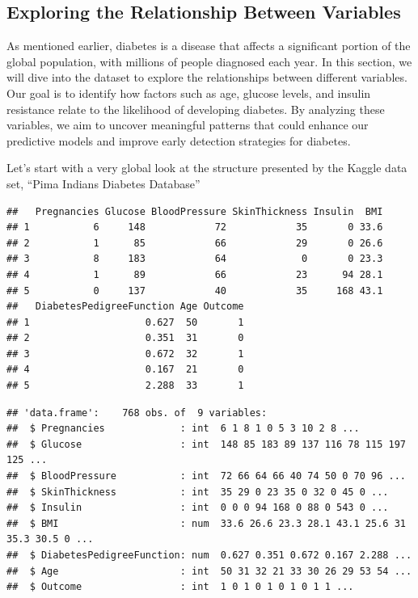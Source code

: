 \documentclass[
]{article}
\begin{document}
\subsection{Exploring the Relationship Between
Variables}\label{exploring-the-relationship-between-variables}

As mentioned earlier, diabetes is a disease that affects a significant
portion of the global population, with millions of people diagnosed each
year. In this section, we will dive into the dataset to explore the
relationships between different variables. Our goal is to identify how
factors such as age, glucose levels, and insulin resistance relate to
the likelihood of developing diabetes. By analyzing these variables, we
aim to uncover meaningful patterns that could enhance our predictive
models and improve early detection strategies for diabetes.

Let's start with a very global look at the structure presented by the
Kaggle data set, ``Pima Indians Diabetes Database''

\begin{verbatim}
##   Pregnancies Glucose BloodPressure SkinThickness Insulin  BMI
## 1           6     148            72            35       0 33.6
## 2           1      85            66            29       0 26.6
## 3           8     183            64             0       0 23.3
## 4           1      89            66            23      94 28.1
## 5           0     137            40            35     168 43.1
##   DiabetesPedigreeFunction Age Outcome
## 1                    0.627  50       1
## 2                    0.351  31       0
## 3                    0.672  32       1
## 4                    0.167  21       0
## 5                    2.288  33       1
\end{verbatim}

\begin{verbatim}
## 'data.frame':    768 obs. of  9 variables:
##  $ Pregnancies             : int  6 1 8 1 0 5 3 10 2 8 ...
##  $ Glucose                 : int  148 85 183 89 137 116 78 115 197 125 ...
##  $ BloodPressure           : int  72 66 64 66 40 74 50 0 70 96 ...
##  $ SkinThickness           : int  35 29 0 23 35 0 32 0 45 0 ...
##  $ Insulin                 : int  0 0 0 94 168 0 88 0 543 0 ...
##  $ BMI                     : num  33.6 26.6 23.3 28.1 43.1 25.6 31 35.3 30.5 0 ...
##  $ DiabetesPedigreeFunction: num  0.627 0.351 0.672 0.167 2.288 ...
##  $ Age                     : int  50 31 32 21 33 30 26 29 53 54 ...
##  $ Outcome                 : int  1 0 1 0 1 0 1 0 1 1 ...
\end{verbatim}
\end{document}
